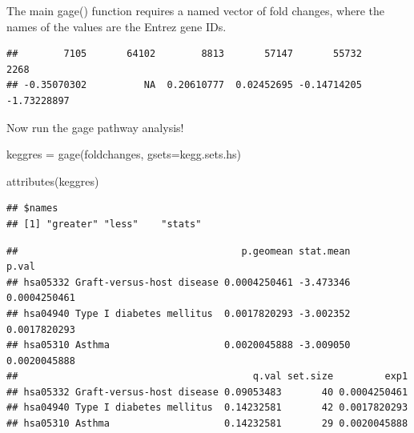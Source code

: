 \documentclass[
]{article}
\newenvironment{Shaded}{\begin{snugshade}}{\end{snugshade}}
\newcommand{\AttributeTok}[1]{\textcolor[rgb]{0.77,0.63,0.00}{#1}}
\newcommand{\CommentTok}[1]{\textcolor[rgb]{0.56,0.35,0.01}{\textit{#1}}}
\newcommand{\DecValTok}[1]{\textcolor[rgb]{0.00,0.00,0.81}{#1}}
\newcommand{\FunctionTok}[1]{\textcolor[rgb]{0.00,0.00,0.00}{#1}}
\newcommand{\NormalTok}[1]{#1}
\newcommand{\OtherTok}[1]{\textcolor[rgb]{0.56,0.35,0.01}{#1}}
\newcommand{\SpecialCharTok}[1]{\textcolor[rgb]{0.00,0.00,0.00}{#1}}
\begin{document}
The main gage() function requires a named vector of fold changes, where
the names of the values are the Entrez gene IDs.

\begin{Shaded}
\end{Shaded}

\begin{verbatim}
##        7105       64102        8813       57147       55732        2268 
## -0.35070302          NA  0.20610777  0.02452695 -0.14714205 -1.73228897
\end{verbatim}

Now run the gage pathway analysis!

\begin{Shaded}
\begin{Highlighting}[]
\NormalTok{keggres }\OtherTok{=} \FunctionTok{gage}\NormalTok{(foldchanges, }\AttributeTok{gsets=}\NormalTok{kegg.sets.hs)}
\end{Highlighting}
\end{Shaded}

\begin{Shaded}
\begin{Highlighting}[]
\FunctionTok{attributes}\NormalTok{(keggres)}
\end{Highlighting}
\end{Shaded}

\begin{verbatim}
## $names
## [1] "greater" "less"    "stats"
\end{verbatim}

\begin{Shaded}
\end{Shaded}

\begin{verbatim}
##                                       p.geomean stat.mean        p.val
## hsa05332 Graft-versus-host disease 0.0004250461 -3.473346 0.0004250461
## hsa04940 Type I diabetes mellitus  0.0017820293 -3.002352 0.0017820293
## hsa05310 Asthma                    0.0020045888 -3.009050 0.0020045888
##                                         q.val set.size         exp1
## hsa05332 Graft-versus-host disease 0.09053483       40 0.0004250461
## hsa04940 Type I diabetes mellitus  0.14232581       42 0.0017820293
## hsa05310 Asthma                    0.14232581       29 0.0020045888
\end{verbatim}
\end{document}

